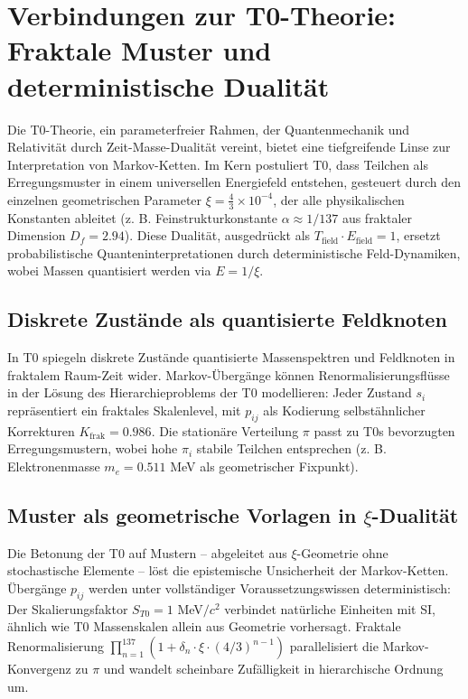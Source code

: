 \documentclass[12pt,a4paper]{article}
\begin{document}
	\section{Verbindungen zur T0-Theorie: Fraktale Muster und deterministische Dualität}
	\label{sec:t0-connection}
	
	Die T0-Theorie, ein parameterfreier Rahmen, der Quantenmechanik und Relativität durch Zeit-Masse-Dualität vereint, bietet eine tiefgreifende Linse zur Interpretation von Markov-Ketten. Im Kern postuliert T0, dass Teilchen als Erregungsmuster in einem universellen Energiefeld entstehen, gesteuert durch den einzelnen geometrischen Parameter $\xi = \frac{4}{3} \times 10^{-4}$, der alle physikalischen Konstanten ableitet (z. B. Feinstrukturkonstante $\alpha \approx 1/137$ aus fraktaler Dimension $D_f = 2.94$). Diese Dualität, ausgedrückt als $T_{\text{field}} \cdot E_{\text{field}} = 1$, ersetzt probabilistische Quanteninterpretationen durch deterministische Feld-Dynamiken, wobei Massen quantisiert werden via $E = 1/\xi$.
	
	\subsection{Diskrete Zustände als quantisierte Feldknoten}
	In T0 spiegeln diskrete Zustände quantisierte Massenspektren und Feldknoten in fraktalem Raum-Zeit wider. Markov-Übergänge können Renormalisierungsflüsse in der Lösung des Hierarchieproblems der T0 modellieren: Jeder Zustand $s_i$ repräsentiert ein fraktales Skalenlevel, mit $p_{ij}$ als Kodierung selbstähnlicher Korrekturen $K_{\text{frak}} = 0.986$. Die stationäre Verteilung $\pi$ passt zu T0s bevorzugten Erregungsmustern, wobei hohe $\pi_i$ stabile Teilchen entsprechen (z. B. Elektronenmasse $m_e = 0.511$ MeV als geometrischer Fixpunkt).
	
	\subsection{Muster als geometrische Vorlagen in $\xi$-Dualität}
	Die Betonung der T0 auf Mustern – abgeleitet aus $\xi$-Geometrie ohne stochastische Elemente – löst die epistemische Unsicherheit der Markov-Ketten. Übergänge $p_{ij}$ werden unter vollständiger Voraussetzungswissen deterministisch: Der Skalierungsfaktor $S_{T0} = 1$ MeV$/c^2$ verbindet natürliche Einheiten mit SI, ähnlich wie T0 Massenskalen allein aus Geometrie vorhersagt. Fraktale Renormalisierung $\prod_{n=1}^{137} (1 + \delta_n \cdot \xi \cdot (4/3)^{n-1})$ parallelisiert die Markov-Konvergenz zu $\pi$ und wandelt scheinbare Zufälligkeit in hierarchische Ordnung um.
	
\end{document}
